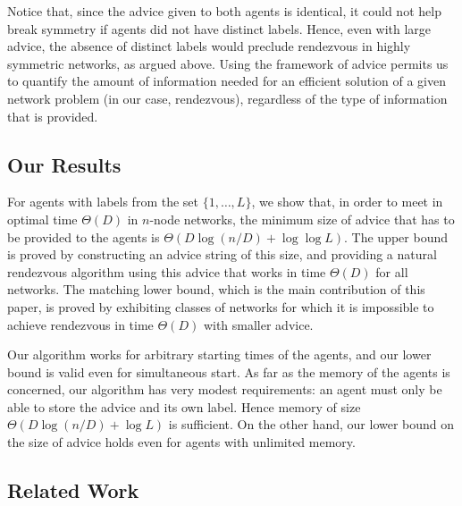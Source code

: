 \documentclass{llncs}
\begin{document}
Notice that, since the advice given to both agents is identical, it could not help break symmetry if agents did not have distinct labels.
Hence, even with large advice, the absence of distinct labels would preclude rendezvous in highly symmetric networks, as argued above.
Using the framework of advice permits us to quantify the amount of information
needed for an efficient solution of a given network problem (in our case, rendezvous), regardless of the type of information that is provided. 

 







\subsection{Our Results}
\label{subsec:ourresults}

For agents with labels from the set $\{1,\dots,L\}$,
we show that, in order to meet in optimal time $\Theta(D)$ in $n$-node networks, the minimum size of advice that has to be provided to the agents is  $\Theta(D\log(n/D)+\log\log L)$. 
The upper bound is proved by constructing an advice string of this size, and providing a natural rendezvous algorithm using this advice that works in time $\Theta(D)$
for all networks.
The matching lower bound, which is the main contribution of this paper, is proved by exhibiting classes of networks for which it is impossible to achieve rendezvous in time $\Theta(D)$
with smaller advice. 

Our algorithm works for arbitrary starting times of the agents, and our lower bound is valid even for simultaneous start.
As far as the memory of the agents is concerned, our algorithm has very modest requirements: an agent must only be able to store the advice and its own label. Hence
memory of size $\Theta(D\log(n/D)+\log L)$ is sufficient. On the other hand, our lower bound on the size of advice holds even for agents with unlimited memory.













\subsection{Related Work}
\label{subsec:relatwork}
\end{document}
